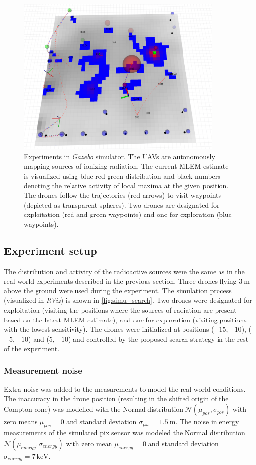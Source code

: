 \begin{figure}[!htb]
  \centering
    \includegraphics[width=0.9\textwidth]{./fig/photos/simu_search.png}
  \caption{Experiments in \textit{Gazebo} simulator. The \ac{UAV}s are autonomously mapping sources of ionizing radiation. 
  The current \ac{MLEM} estimate is visualized using blue-red-green distribution and black numbers denoting the relative activity of local maxima at the given position. 
  The drones follow the trajectories (red arrows) to visit waypoints (depicted as transparent spheres). Two drones are designated for exploitation (red and green waypoints) and one for exploration (blue waypoints).}
  \label{fig:simu_search}
\end{figure}

\subsection{Experiment setup}
The distribution and activity of the radioactive sources were the same as in the real-world experiments described in the previous section.
Three drones flying $\SI{3}{\meter}$ above the ground were used during the experiment.  
The simulation process (visualized in \textit{RViz}) is shown in \autoref{fig:simu_search}.
Two drones were designated for exploitation (visiting the positions where the sources of radiation are present based on the latest \ac{MLEM} estimate), and one for exploration (visiting positions with the lowest sensitivity). 
The drones were initialized at positions ($-15, -10$), ($-5, -10$) and ($5, -10$) and controlled by the proposed search strategy in the rest of the experiment.
\subsubsection{Measurement noise}
Extra noise was added to the measurements to model the real-world conditions.
The inaccuracy in the drone position (resulting in the shifted origin of the Compton cone) was modelled with the Normal distribution $\mathcal{N}(\mu_{pos}, \sigma_{pos})$ with zero means $\mu_{pos} = 0$ and standard deviation $\sigma_{pos} = \SI{1.5}{\meter}$. 
The noise in energy measurements of the simulated \ac{pix} sensor was modeled the Normal distribution $\mathcal{N}(\mu_{energy}, \sigma_{energy})$ with zero mean $\mu_{energy} = 0$ and standard deviation $\sigma_{energy} = \SI{7}{\kilo\electronvolt}$.

